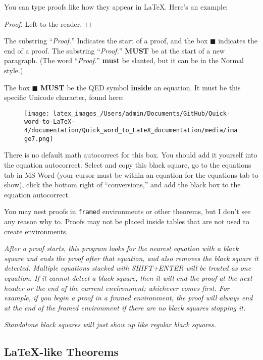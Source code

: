 \documentclass[12pt]{article}
\theoremstyle{plain}
\theoremstyle{remark}
\theoremstyle{definition}
\begin{document}
You can type proofs like how they appear in LaTeX. Here's an example:

\begin{proof} Left to the reader. 
\end{proof}

The substring ``\emph{Proof.}'' Indicates the start of a proof, and the
box \(\blacksquare\) indicates the end of a proof. The substring
``\emph{Proof.}'' \textbf{MUST} be at the start of a new paragraph. (The
word ``\emph{Proof.}'' \textbf{must} be slanted, but it can be in the
Normal style.)

The box \(\blacksquare\) \textbf{MUST} be the QED symbol \textbf{inside}
an equation. It must be this specific Unicode character, found here:


\begin{figure}[H]
\centering
\texttt{[image: latex\_images\_/Users/admin/Documents/GitHub/Quick-word-to-LaTeX-4/documentation/Quick\_word\_to\_LaTeX\_documentation/media/image7.png]}
\end{figure}


There is no default math autocorrect for this box. You should add it
yourself into the equation autocorrect. Select and copy this black
square, go to the equations tab in MS Word (your cursor must be within
an equation for the equations tab to show), click the bottom right of
``conversions,'' and add the black box to the equation autocorrect.

You may nest proofs in \texttt{framed} environments or other theorems,
but I don't see any reason why to. Proofs may not be placed inside
tables that are not used to create environments.

\emph{After a proof starts, this program looks for the nearest equation
with a black square and ends the proof after that equation, and also
removes the black square it detected. Multiple equations stacked with
SHIFT+ENTER will be treated as one equation. If it cannot detect a black
square, then it will end the proof at the next header or the end of the
current environment; whichever comes first. For example, if you begin a
proof in a framed environment, the proof will always end at the end of
the framed environment if there are no black squares stopping it.}

\emph{Standalone black squares will just show up like regular black
squares.}


\subsection{LaTeX-like Theorems}
\end{document}
